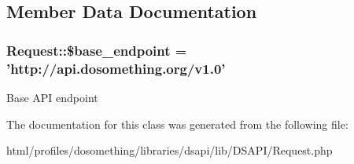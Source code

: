 \subsection{Member Data Documentation}
\hypertarget{classRequest_ae5bf9331eb37302c8c46834078a79a1e}{
\subsubsection[{\$base\_\-endpoint}]{\setlength{\rightskip}{0pt plus 5cm}Request::\$base\_\-endpoint = 'http://api.dosomething.org/v1.0'}}
\label{classRequest_ae5bf9331eb37302c8c46834078a79a1e}
Base API endpoint 

The documentation for this class was generated from the following file:\begin{DoxyCompactItemize}
\item 
html/profiles/dosomething/libraries/dsapi/lib/DSAPI/Request.php\end{DoxyCompactItemize}
